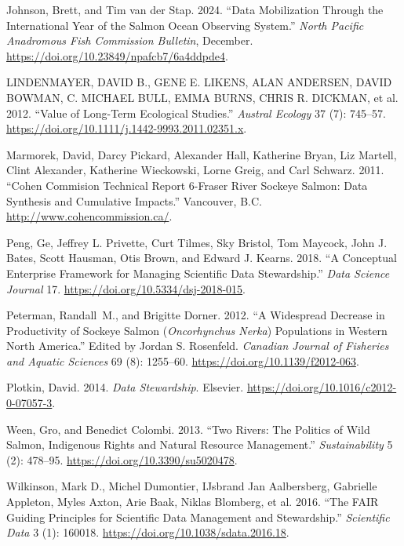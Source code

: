 \documentclass[
  letterpaper,
  DIV=11,
  numbers=noendperiod]{scrartcl}
\newlength{\cslhangindent}
\newenvironment{CSLReferences}[2] %
 {\begin{list}{}{%
  \setlength{\itemindent}{0pt}
  \setlength{\leftmargin}{0pt}
  \setlength{\parsep}{0pt}
  \ifodd #1
   \setlength{\leftmargin}{\cslhangindent}
   \setlength{\itemindent}{-1\cslhangindent}
  \fi
  \setlength{\itemsep}{#2\baselineskip}}}
 {\end{list}}
\begin{document}
\begin{CSLReferences}{1}{0}
Johnson, Brett, and Tim van der Stap. 2024. {``Data Mobilization Through
the International Year of the Salmon Ocean Observing System.''}
\emph{North Pacific Anadromous Fish Commission Bulletin}, December.
\url{https://doi.org/10.23849/npafcb7/6a4ddpde4}.

LINDENMAYER, DAVID B., GENE E. LIKENS, ALAN ANDERSEN, DAVID BOWMAN, C.
MICHAEL BULL, EMMA BURNS, CHRIS R. DICKMAN, et al. 2012. {``Value of
Long{-}Term Ecological Studies.''} \emph{Austral Ecology} 37 (7):
745--57. \url{https://doi.org/10.1111/j.1442-9993.2011.02351.x}.

Marmorek, David, Darcy Pickard, Alexander Hall, Katherine Bryan, Liz
Martell, Clint Alexander, Katherine Wieckowski, Lorne Greig, and Carl
Schwarz. 2011. {``Cohen Commision Technical Report 6-Fraser River
Sockeye Salmon: Data Synthesis and Cumulative Impacts.''} Vancouver,
B.C. \url{http://www.cohencommission.ca/}.

Peng, Ge, Jeffrey L. Privette, Curt Tilmes, Sky Bristol, Tom Maycock,
John J. Bates, Scott Hausman, Otis Brown, and Edward J. Kearns. 2018.
{``A Conceptual Enterprise Framework for Managing Scientific Data
Stewardship.''} \emph{Data Science Journal} 17.
\url{https://doi.org/10.5334/dsj-2018-015}.

Peterman, Randall~M., and Brigitte Dorner. 2012. {``A Widespread
Decrease in Productivity of Sockeye Salmon ({\emph{Oncorhynchus Nerka}})
Populations in Western North America.''} Edited by Jordan S. Rosenfeld.
\emph{Canadian Journal of Fisheries and Aquatic Sciences} 69 (8):
1255--60. \url{https://doi.org/10.1139/f2012-063}.

Plotkin, David. 2014. \emph{Data Stewardship}. Elsevier.
\url{https://doi.org/10.1016/c2012-0-07057-3}.

Ween, Gro, and Benedict Colombi. 2013. {``Two Rivers: The Politics of
Wild Salmon, Indigenous Rights and Natural Resource Management.''}
\emph{Sustainability} 5 (2): 478--95.
\url{https://doi.org/10.3390/su5020478}.

Wilkinson, Mark D., Michel Dumontier, IJsbrand Jan Aalbersberg,
Gabrielle Appleton, Myles Axton, Arie Baak, Niklas Blomberg, et al.
2016. {``The FAIR Guiding Principles for Scientific Data Management and
Stewardship.''} \emph{Scientific Data} 3 (1): 160018.
\url{https://doi.org/10.1038/sdata.2016.18}.

\end{CSLReferences}
\end{document}
